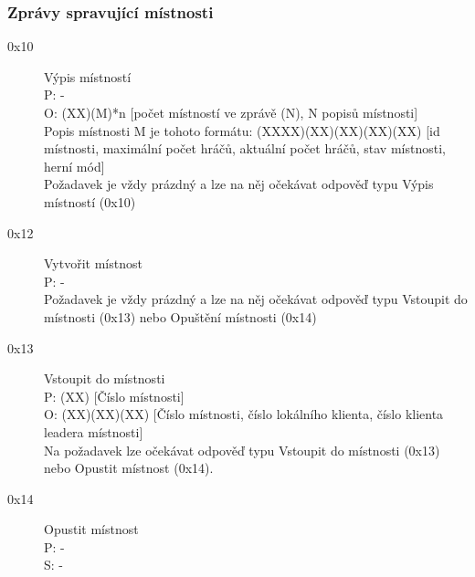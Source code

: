 \documentclass[12pt,a4paper]{article}
\begin{document}
\subsubsection*{Zprávy spravující místnosti}
\begin{description}
\item[0x10] Výpis místností \\
P: - \\
O: (XX)(M)*n [počet místností ve zprávě (N), N popisů místnosti] \\
Popis místnosti M je tohoto formátu: (XXXX)(XX)(XX)(XX)(XX) [id místnosti, maximální počet hráčů, aktuální počet hráčů, stav místnosti, herní mód] \\
Požadavek je vždy prázdný a lze na něj očekávat odpověď typu Výpis místností (0x10)
\item[0x12] Vytvořit místnost \\
P: - \\
Požadavek je vždy prázdný a lze na něj očekávat odpověď typu Vstoupit do místnosti (0x13) nebo Opuštění místnosti (0x14)
\item[0x13] Vstoupit do místnosti\\
P: (XX) [Číslo místnosti] \\
O: (XX)(XX)(XX) [Číslo místnosti, číslo lokálního klienta, číslo klienta leadera místnosti] \\
Na požadavek lze očekávat odpověď typu Vstoupit do místnosti (0x13) nebo Opustit místnost (0x14).
\item[0x14] Opustit místnost \\
P: - \\
S: -
\end{description}
\end{document}
